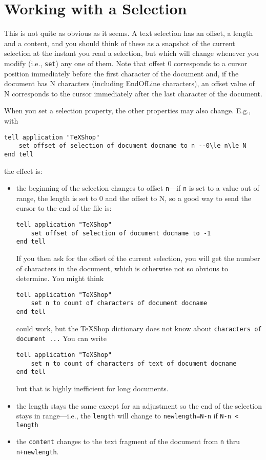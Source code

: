 \documentclass[11pt]{amsart}
\begin{document}
\section{Working with a Selection}
This is not quite as obvious as it seems. A text selection has an offset, a length and a content, and you should think of these as a snapshot of the current selection at the instant  you read a selection, but which will change whenever you modify (i.e., {\tt set}) any one of them. Note that offset $0$ corresponds to a cursor position immediately before the first character of the document and, if the document has N characters (including EndOfLine characters), an offset value of N corresponds to the cursor immediately after the last character of the document. 

When you set a selection property, the other properties may also change. E.g., with
\begin{verbatim}
tell application "TeXShop"
    set offset of selection of document docname to n --0\le n\le N
end tell
\end{verbatim}
the effect is:
\begin{itemize}
\item
the beginning of the selection changes to offset {\tt n}---if {\tt n} is set to a value out of range, the length is set to $0$ and the offset to N, so a good way to send the cursor to the end of the file is: 
\begin{verbatim}
tell application "TeXShop"
    set offset of selection of document docname to -1
end tell
\end{verbatim}
If you then ask for the offset of the current selection, you will get the number of characters in the document, which is otherwise not so obvious to determine. You might think
\begin{verbatim}
tell application "TeXShop"
    set n to count of characters of document docname
end tell
\end{verbatim}
could  work, but the \TeX Shop dictionary does not know about \verb|characters of document ...| You can write
\begin{verbatim}
tell application "TeXShop"
    set n to count of characters of text of document docname
end tell
\end{verbatim}
but that is highly inefficient for long documents.
\item the length stays the same except for an adjustment so the end of the selection stays in range---i.e., the {\tt length} will change to {\tt newlength=N-n} if \verb|N-n < length| 
\item  the {\tt content} changes to the text fragment of the document from {\tt n} thru {\tt n+newlength}.
\end{itemize}
\end{document}

